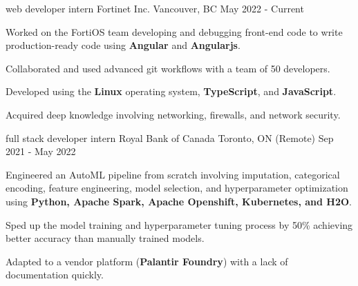 

\begin{cventries}

  \cventry
    {web developer intern} %
    {Fortinet Inc.} %
    {Vancouver, BC} %
    {May 2022 - Current} %
    {
      \begin{cvitems} %
        \item {Worked on the FortiOS team developing and debugging front-end code to write production-ready code using \textbf{Angular} and \textbf{Angularjs}.}        
        \item {Collaborated and used advanced git workflows with a team of 50 developers.}         
        \item {Developed using the \textbf{Linux} operating system, \textbf{TypeScript}, and \textbf{JavaScript}.}    
        \item {Acquired deep knowledge involving networking, firewalls, and network security.}  
      \end{cvitems}
    } 

  \cventry
    {full stack developer intern} %
    {Royal Bank of Canada} %
    {Toronto, ON (Remote)} %
    {Sep 2021 - May 2022} %
    {
      \begin{cvitems} %
        \item {Engineered an AutoML pipeline from scratch involving imputation, categorical encoding, feature engineering, model selection, and hyperparameter optimization using \textbf{Python, Apache Spark, Apache Openshift, Kubernetes, and H2O}.}  
        \item {Sped up the model training and hyperparameter tuning process by 50\% achieving better accuracy than manually trained models.}    
        \item {Adapted to a vendor platform (\textbf{Palantir Foundry}) with a lack of documentation quickly.} 
      \end{cvitems}
    }


\end{cventries}

